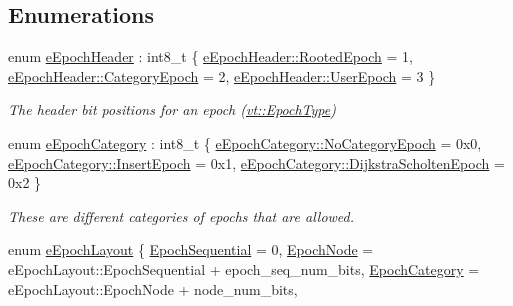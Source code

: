 \subsection*{Enumerations}
\begin{DoxyCompactItemize}
\item 
enum \hyperlink{namespacevt_1_1epoch_a8cbcd2bf5d3ce987837869c26a1d00ad}{e\+Epoch\+Header} \+: int8\+\_\+t \{ \hyperlink{namespacevt_1_1epoch_a8cbcd2bf5d3ce987837869c26a1d00ada4bbf8ef3641b58f81dc5320f32df0178}{e\+Epoch\+Header\+::\+Rooted\+Epoch} = 1, 
\hyperlink{namespacevt_1_1epoch_a8cbcd2bf5d3ce987837869c26a1d00ada7e4e5d5531b30ec86d6509a25b381acf}{e\+Epoch\+Header\+::\+Category\+Epoch} = 2, 
\hyperlink{namespacevt_1_1epoch_a8cbcd2bf5d3ce987837869c26a1d00ada1a31742d5ce22b2a4450ba9687b7e7ce}{e\+Epoch\+Header\+::\+User\+Epoch} = 3
 \}\begin{DoxyCompactList}\small\item\em The header bit positions for an epoch ({\ttfamily \hyperlink{namespacevt_a985a5adf291c34a3ca263b3378388236}{vt\+::\+Epoch\+Type}}) \end{DoxyCompactList}
\item 
enum \hyperlink{namespacevt_1_1epoch_a956abe0aceef0d10a988de8acb002c7c}{e\+Epoch\+Category} \+: int8\+\_\+t \{ \hyperlink{namespacevt_1_1epoch_a956abe0aceef0d10a988de8acb002c7caa6136714a068313660a40ae6bd15410c}{e\+Epoch\+Category\+::\+No\+Category\+Epoch} = 0x0, 
\hyperlink{namespacevt_1_1epoch_a956abe0aceef0d10a988de8acb002c7cae357e225fcb0ad22e8152c68f4d9829f}{e\+Epoch\+Category\+::\+Insert\+Epoch} = 0x1, 
\hyperlink{namespacevt_1_1epoch_a956abe0aceef0d10a988de8acb002c7ca317c96e0b9f3b6871d4832a7f9e31e9f}{e\+Epoch\+Category\+::\+Dijkstra\+Scholten\+Epoch} = 0x2
 \}\begin{DoxyCompactList}\small\item\em These are different categories of epochs that are allowed. \end{DoxyCompactList}
\item 
enum \hyperlink{namespacevt_1_1epoch_a327a45834b567f1268737d5e10b05f9d}{e\+Epoch\+Layout} \{ \newline
\hyperlink{namespacevt_1_1epoch_a327a45834b567f1268737d5e10b05f9da4856035e8053e98e5720f6d6038a5234}{Epoch\+Sequential} = 0, 
\hyperlink{namespacevt_1_1epoch_a327a45834b567f1268737d5e10b05f9da4ff7991e6e08fa42f784b482bb1ca010}{Epoch\+Node} = e\+Epoch\+Layout\+:\+:Epoch\+Sequential + epoch\+\_\+seq\+\_\+num\+\_\+bits, 
\hyperlink{namespacevt_1_1epoch_a327a45834b567f1268737d5e10b05f9da9c44720a0232af689549239e6467e63b}{Epoch\+Category} = e\+Epoch\+Layout\+:\+:Epoch\+Node + node\+\_\+num\+\_\+bits, 

\end{DoxyCompactItemize}
